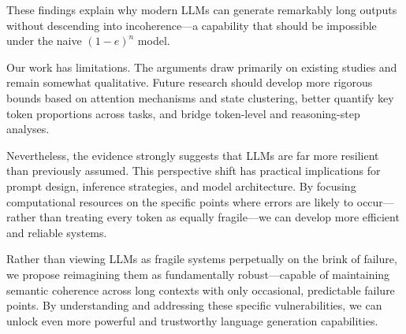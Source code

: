 \documentclass{article}
\begin{document}
These findings explain why modern LLMs can generate remarkably long outputs without descending into incoherence—a capability that should be impossible under the naive $(1-e)^n$ model.

Our work has limitations. The arguments draw primarily on existing studies and remain somewhat qualitative. Future research should develop more rigorous bounds based on attention mechanisms and state clustering, better quantify key token proportions across tasks, and bridge token-level and reasoning-step analyses.

Nevertheless, the evidence strongly suggests that LLMs are far more resilient than previously assumed. This perspective shift has practical implications for prompt design, inference strategies, and model architecture. By focusing computational resources on the specific points where errors are likely to occur—rather than treating every token as equally fragile—we can develop more efficient and reliable systems.

Rather than viewing LLMs as fragile systems perpetually on the brink of failure, we propose reimagining them as fundamentally robust—capable of maintaining semantic coherence across long contexts with only occasional, predictable failure points. By understanding and addressing these specific vulnerabilities, we can unlock even more powerful and trustworthy language generation capabilities.



\end{document}
